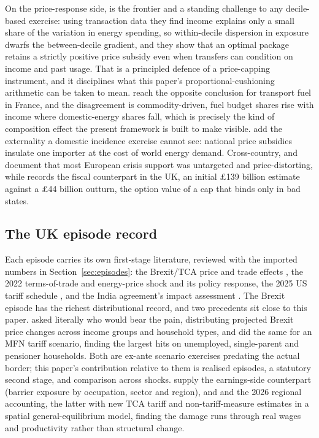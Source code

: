 On the price-response side, \citet{levell2025} is the frontier and a
standing challenge to any decile-based exercise: using transaction
data they find income explains only a small share of the variation in
energy spending, so within-decile dispersion in exposure dwarfs the
between-decile gradient, and they show that an optimal package retains
a strictly positive price subsidy even when transfers can condition on
income and past usage. That is a principled defence of a
price-capping instrument, and it disciplines what this paper's
proportional-cushioning arithmetic can be taken to mean.
\citet{bonnet2025} reach the opposite conclusion for transport fuel in
France, and the disagreement is commodity-driven, fuel budget shares
rise with income where domestic-energy shares fall, which is
precisely the kind of composition effect the present framework is
built to make visible. \citet{auclert2023} add the externality a
domestic incidence exercise cannot see: national price subsidies
insulate one importer at the cost of world energy demand. Cross-country,
\citet{ari2022} and \citet{amaglobeli2026} document that most European
crisis support was untargeted and price-distorting, while
\citet{nao2024} records the fiscal counterpart in the UK, an
initial \pounds 139 billion estimate against a \pounds 44 billion
outturn, the option value of a cap that binds only in bad states.

\subsection{The UK episode record}

Each episode carries its own first-stage literature, reviewed with the
imported numbers in Section~\ref{sec:episodes}: the Brexit/TCA price
and trade effects \citep{bakker2026, breinlich2022, freeman2022}, the
2022 terms-of-trade and energy-price shock and its policy response, the
2025 US tariff schedule \citep{obr2025}, and the India agreement's
impact assessment \citep{dbtindia2026}. The Brexit episode has the richest distributional record, and two
precedents sit close to this paper. \citet{breinlich2016} asked
literally who would bear the pain, distributing projected Brexit price
changes across income groups and household types, and
\citet{clarke2017} did the same for an MFN tariff scenario, finding
the largest hits on unemployed, single-parent and pensioner
households. Both are ex-ante scenario exercises predating the actual
border; this paper's contribution relative to them is realised
episodes, a statutory second stage, and comparison across shocks.
\citet{davenportlevell2021} supply the earnings-side counterpart
(barrier exposure by occupation, sector and region), and
\citet{alabrese2026} and \citet{dhingra2026} the 2026 regional
accounting, the latter with new TCA tariff and non-tariff-measure
estimates in a spatial general-equilibrium model, finding the damage
runs through real wages and productivity rather than structural
change.

